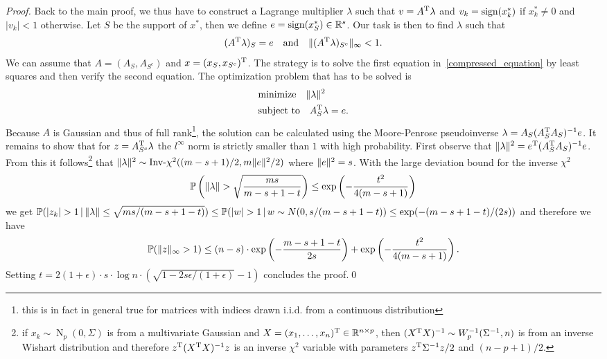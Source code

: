 \documentclass{article} %
\newcommand{\given}{\,|\,}
\begin{document}
\begin{proof}
Back to the main proof, we thus have to construct a Lagrange multiplier $\lambda$ such that $v = A^{\rm T} \lambda$ and $v_k = \operatorname{sign}(x^*_k)$ if $x^*_k\neq 0$ and $|v_k| < 1$ otherwise. Let $S$ be the support of $x^*$, then we define $e = \operatorname{sign}(x^*_S)\in \mathbb{R}^s$. Our task is then to find $\lambda$ such that
\begin{align}\label{compressed_equation}
  (A^{\rm T} \lambda)_S = e\quad\text{and}\quad \lVert(A^{\rm T} \lambda)_{S^c}\rVert_\infty < 1.
\end{align}
  We can assume that $A = (A_S, A_{S^c})$ and $x = (x_S, x_{S^c})^{\rm T}$. The strategy is to solve the first equation in~\eqref{compressed_equation} by least squares and then verify the second equation. The optimization problem that has to be solved is
  \begin{align*}
    &\text{minimize}\quad \lVert\lambda\rVert^2\\
    &\text{subject to}\quad A_S^{\rm T} \lambda = e.
  \end{align*}
    Because $A$ is Gaussian and thus of full rank\footnote{this is in fact in general true for matrices with indices drawn i.i.d. from a continuous distribution}, the solution can be calculated using the Moore-Penrose pseudoinverse $\lambda = A_S(A_S^{\rm T} A_S)^{-1} e$.
It remains to show that for $z = A_{S^c}^{\rm T}\lambda$ the $l^{\infty}$ norm is strictly smaller than $1$ with high probability. First observe that $\|\lambda\|^2 = e^{\rm T}(A_S^{\rm T} A_S)^{-1} e$.
From this it follows\footnote{if $x_k \sim \operatorname{N}_p(0, \Sigma)$ is from a multivariate Gaussian and $X = (x_1, \dots, x_n)^{\rm T} \in \mathbb{R}^{n\times p}$, then $(X^{\rm T} X)^{-1} \sim W_p^{-1}(\Sigma^{-1}, n)$ is from an inverse Wishart distribution and therefore $z^{\rm T} (X^{\rm T} X)^{-1} z$ is an inverse $\chi^2$ variable with parameters $z^{\rm T} \Sigma^{-1} z/2$ and $(n-p+1)/2$.} that $\|\lambda\|^2\sim \text{Inv-$\chi^2$}((m-s+1)/2, m \lVert e\rVert^2/2)$ where $\lVert e\rVert^2 = s$. With the large deviation bound for the inverse $\chi^2$
\begin{align*}
  \mathbb{P}\left(\lVert\lambda\rVert > \sqrt{\frac{ms}{m-s+1-t}}\right) \leq
  \exp\left(-\frac{t^2}{4(m-s+1)}\right)
\end{align*}
we get $\P(|z_k| > 1 \given \norm{\lambda} \leq
\sqrt{ms/(m-s+1-t)}) \leq \P(|w| > 1\given w\sim N(0, s/(m-s+1-t))
\leq \exp(-(m-s+1-t)/(2s))$ and therefore we have
\begin{equation*}
  \mathbb{P}(\lVert z\rVert_\infty > 1) \leq (n-s)\cdot \exp\left(-\frac{m-s+1-t}{2s}\right) + 
  \exp\left(-\frac{t^2}{4(m-s+1)}\right).
\end{equation*}
Setting $t = 2(1+\epsilon) \cdot s\cdot \log n
\cdot (\sqrt{1-2s\epsilon/(1+\epsilon)} - 1)$ concludes the proof.\qed
    \end{proof}
\end{document}
